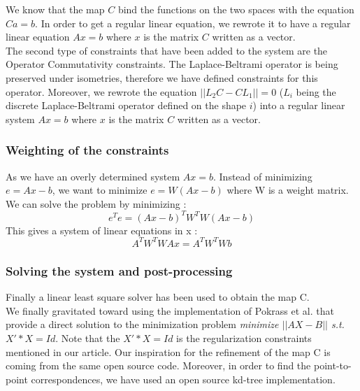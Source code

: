 \documentclass[10pt,twocolumn,letterpaper]{article}
\begin{document}
We know that the map $C$ bind the functions on the two spaces with the equation $Ca = b$. In order to get a regular linear equation, we rewrote it to have a regular linear equation $Ax = b$ where $x$ is the matrix $C$ written as a vector.\\

The second type of constraints that have been added to the system are the Operator Commutativity constraints. The Laplace-Beltrami operator is being preserved under isometries, therefore we have defined constraints for this operator. Moreover, we rewrote the equation $||L_{2}C - CL_{1}|| = 0$ ($L_{i}$ being the discrete Laplace-Beltrami operator defined on the shape $i$) into a regular linear system $Ax = b$ where $x$ is the matrix $C$ written as a vector. 

\subsubsection*{Weighting of the constraints}
As we have an overly determined system $Ax = b$. Instead of minimizing $e = Ax-b$, we want to minimize $e = W(Ax-b)$ where W is a weight matrix. We can solve the problem by minimizing :
\begin{equation}
e^{T}e = (Ax-b)^{T}W^{T}W(Ax-b)
\end{equation}
This gives a system of linear equations in x :
\begin{equation}
A^{T}W^{T}WAx = A^{T}W^{T}Wb
\end{equation}

\subsubsection*{Solving the system and post-processing}
Finally a linear least square solver has been used to obtain the map C. \\

We finally gravitated toward using the implementation of Pokrass et al. that provide a direct solution to the minimization problem \textit{minimize $||AX - B||$ s.t. $X'*X = Id$}. Note that the $X'*X = Id$ is the regularization constraints mentioned in our article. Our inspiration for the refinement of the map C is coming from the same open source code. Moreover, in order to find the point-to-point correspondences, we have used an open source kd-tree implementation.
\end{document}
